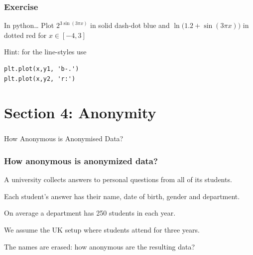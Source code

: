 \documentclass[dvips, %
               xcolor=pst,
               hyperref={colorlinks=false,
               dvips,
               citecolor=magenta,menucolor=cyan,
               bookmarks,bookmarksopen,pdfpagemode=UseThumbs}
              ]{beamer}
\renewcommand{\blue}{}}{\newcommand{\emphy}{}}
\begin{document}
% 
% 
% 
% 

\begin{frame}[fragile]\frametitle{Exercise}

\begin{block}{In python\ldots}
Plot $2^{3\sin(3\pi x)}$ in solid dash-dot blue and
$\ln\big(1.2+\sin(3\pi x)\big)$ in dotted red for $x\in[-4,3]$
\end{block}


Hint: for the line-styles use
\begin{verbatim}
plt.plot(x,y1, 'b-.')
plt.plot(x,y2, 'r:')
\end{verbatim}


\end{frame}

\section{Section 4: Anonymity}

\begin{frame}[fragile]\frametitle{}

\vfill
\begin{center}
\LARGE\blue

How Anonymous is Anonymised Data?

\end{center}
\vfill

\end{frame}



\begin{frame}[fragile]\frametitle{How anonymous is anonymized data?}

\pause\medskip
A university collects answers to personal questions from all of its students.

\pause\medskip
Each student's answer has their name, date of birth, gender and department.

\pause\medskip
On average a department has 250 students in each year.

\pause\medskip
We assume the UK setup where students attend for three years.

\pause\medskip
\alert{The names are erased: how anonymous are the resulting data?}

\end{frame}
\end{document}
